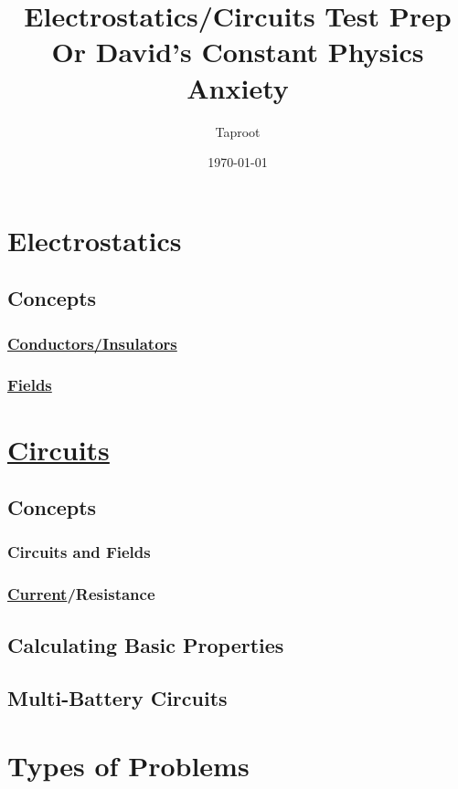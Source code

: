 \documentclass[letterpaper]{article}
\author{Taproot}
\date{\today}
\title{Electrostatics/Circuits Test Prep\\\medskip
\large Or David's Constant Physics Anxiety}
\renewcommand\maketitle{}
\begin{document}
\maketitle

\section{Electrostatics}
\label{sec:org3997420}
\subsection{Concepts}
\label{sec:org118b94a}
\subsubsection{\href{phys250-electrostatics.org}{Conductors/Insulators}}
\label{sec:orgd9c55ef}
\subsubsection{\href{phys250-fields.org}{Fields}}
\label{sec:orgf0d3e42}
\section{\href{circuits.org}{Circuits}}
\label{sec:orgac35b44}
\subsection{Concepts}
\label{sec:org2731db8}
\subsubsection{Circuits and Fields}
\label{sec:org5de0a90}
\subsubsection{\href{20200909105807-current.org}{Current}/Resistance}
\label{sec:org155f07f}
\subsection{Calculating Basic Properties}
\label{sec:org831f8df}
\subsection{Multi-Battery Circuits}
\label{sec:orgd35b82c}
\section{Types of Problems}
\label{sec:orge59de72}
\end{document}
